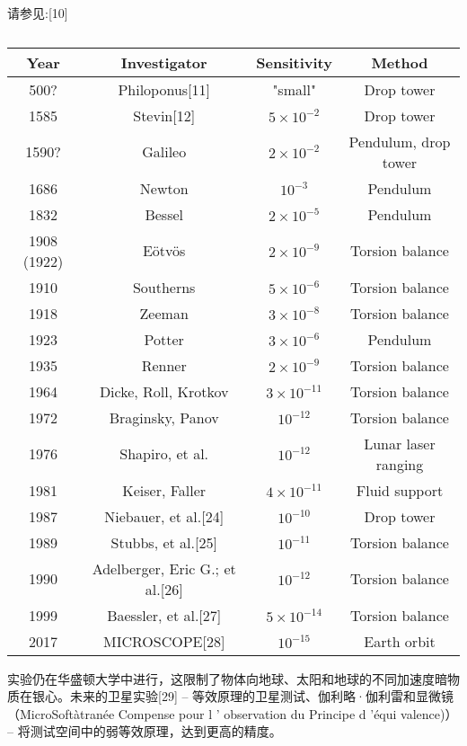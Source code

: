请参见:[10]

\begin{table}[ht]
\centering
\caption\label{tab_DXYL_1}
\begin{tabular}{|c|c|c|c}
\hline
\textbf{Year}&\textbf{Investigator} & \textbf{Sensitivity} & \textbf{Method} \\
\hline
500? & Philoponus[11]& "small" & Drop tower \\
\hline
1585 &	Stevin[12] &$5 \times 10^{-2}$ & Drop tower  \\
\hline
1590? & Galileo & $2 \times 10^{-2}$ & Pendulum, drop tower \\ 
\hline 
1686 & Newton & $10^{-3}$ & Pendulum \\
\hline 
1832 & Bessel &$2 \times 10^{-5}$ & Pendulum  \\
\hline 
1908 (1922) & Eötvös & $2 \times 10^{-9}$ & Torsion balance \\
\hline 
1910 & Southerns & $5 \times 10^{-6}$ & Torsion balance \\
\hline 
1918 & Zeeman & $3 \times 10^{-8}$ & Torsion balance \\
\hline 
1923 & Potter & $3 \times 10^{-6}$ & Pendulum \\
\hline 
1935 & Renner & $2 \times 10^{-9}$ & Torsion balance  \\
\hline
1964 & Dicke, Roll, Krotkov & $3 \times 10^{-11}$ & Torsion balance \\
\hline
1972 & Braginsky, Panov & $10^{-12}$ & Torsion balance \\
\hline
1976 & Shapiro, et al. & $10^{-12}$ & Lunar laser ranging \\
\hline
1981 & Keiser, Faller & $4 \times 10^{-11}$ & Fluid support \\
\hline
1987 & Niebauer, et al.[24] & $ 10^{-10}$ & Drop tower \\
\hline
1989 & Stubbs, et al.[25]& $ 10^{-11}$ & Torsion balance \\
\hline
1990 & Adelberger, Eric G.; et al.[26]& $ 10^{-12}$ & Torsion balance \\
\hline
1999&Baessler, et al.[27]&$ 5 \times 10^{-14}$& Torsion balance \\
\hline
2017& MICROSCOPE[28]& $ 10^{-15}$ & Earth orbit\\
\hline
\end{tabular}
\end{table}

实验仍在华盛顿大学中进行，这限制了物体向地球、太阳和地球的不同加速度暗物质在银心。未来的卫星实验[29] – 等效原理的卫星测试、伽利略·伽利雷和显微镜（MicroSoftàtranée Compense pour l ' observation du Principe d 'équi valence)） – 将测试空间中的弱等效原理，达到更高的精度。

